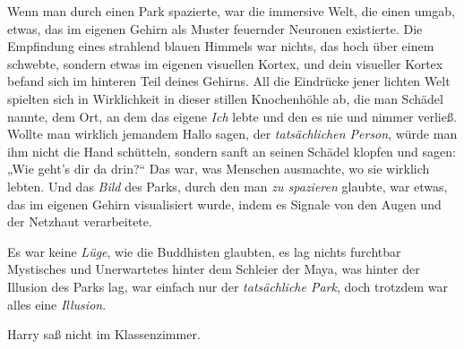 Wenn man durch einen Park spazierte, war die immersive Welt, die einen umgab, etwas, das im eigenen Gehirn als Muster feuernder Neuronen existierte. Die Empfindung eines strahlend blauen Himmels war nichts, das hoch über einem schwebte, sondern etwas im eigenen visuellen Kortex, und dein visueller Kortex befand sich im hinteren Teil deines Gehirns. All die Eindrücke jener lichten Welt spielten sich in Wirklichkeit in dieser stillen Knochenhöhle ab, die man Schädel nannte, dem Ort, an dem das eigene \emph{Ich} lebte und den es nie und nimmer verließ. Wollte man wirklich jemandem Hallo sagen, der \emph{tatsächlichen Person}, würde man ihm nicht die Hand schütteln, sondern sanft an seinen Schädel klopfen und sagen:
„Wie geht’s dir da drin?“ Das war, was Menschen ausmachte, wo sie wirklich lebten. Und das \emph{Bild} des Parks, durch den man \emph{zu spazieren} glaubte, war etwas, das im eigenen Gehirn visualisiert wurde, indem es Signale von den Augen und der Netzhaut verarbeitete.

Es war keine \emph{Lüge}, wie die Buddhisten glaubten, es lag nichts furchtbar Mystisches und Unerwartetes hinter dem Schleier der Maya, was hinter der Illusion des Parks lag, war einfach nur der \emph{tatsächliche Park}, doch trotzdem war alles eine \emph{Illusion}.

Harry saß nicht im Klassenzimmer.

